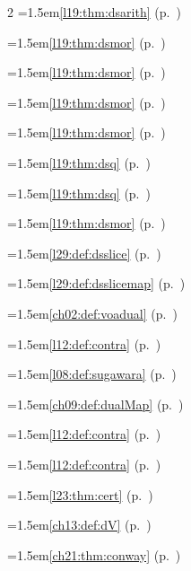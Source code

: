\begin{multicols}{2}
\hangindent=1.5em\quad \ref{l19:thm:dsarith} (p.~\pageref{l19:thm:dsarith})\par
\hangindent=1.5em\quad \ref{l19:thm:dsmor} (p.~\pageref{l19:thm:dsmor})\par
\hangindent=1.5em\quad \ref{l19:thm:dsmor} (p.~\pageref{l19:thm:dsmor})\par
\hangindent=1.5em\quad \ref{l19:thm:dsmor} (p.~\pageref{l19:thm:dsmor})\par
\hangindent=1.5em\quad \ref{l19:thm:dsmor} (p.~\pageref{l19:thm:dsmor})\par
\hangindent=1.5em\quad \ref{l19:thm:dsq} (p.~\pageref{l19:thm:dsq})\par
\hangindent=1.5em\quad \ref{l19:thm:dsq} (p.~\pageref{l19:thm:dsq})\par
\hangindent=1.5em\quad \ref{l19:thm:dsmor} (p.~\pageref{l19:thm:dsmor})\par
\hangindent=1.5em\quad \ref{l29:def:dsslice} (p.~\pageref{l29:def:dsslice})\par
\hangindent=1.5em\quad \ref{l29:def:dsslicemap} (p.~\pageref{l29:def:dsslicemap})\par
\hangindent=1.5em\quad \ref{ch02:def:voadual} (p.~\pageref{ch02:def:voadual})\par
\hangindent=1.5em\quad \ref{l12:def:contra} (p.~\pageref{l12:def:contra})\par
\hangindent=1.5em\quad \ref{l08:def:sugawara} (p.~\pageref{l08:def:sugawara})\par
\hangindent=1.5em\quad \ref{ch09:def:dualMap} (p.~\pageref{ch09:def:dualMap})\par
\hangindent=1.5em\quad \ref{l12:def:contra} (p.~\pageref{l12:def:contra})\par
\hangindent=1.5em\quad \ref{l12:def:contra} (p.~\pageref{l12:def:contra})\par
\hangindent=1.5em\quad \ref{l23:thm:cert} (p.~\pageref{l23:thm:cert})\par
\hangindent=1.5em\quad \ref{ch13:def:dV} (p.~\pageref{ch13:def:dV})\par
\hangindent=1.5em\quad \ref{ch21:thm:conway} (p.~\pageref{ch21:thm:conway})\par

\end{multicols}

